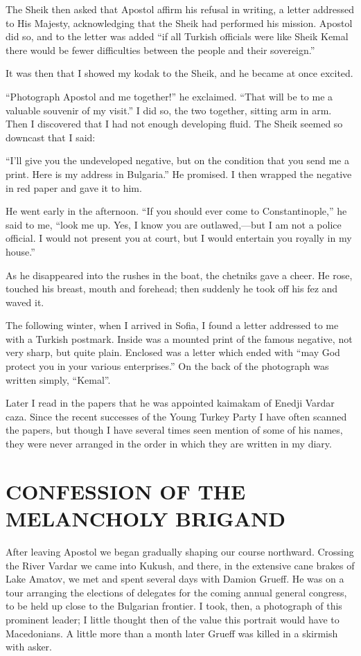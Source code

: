 \documentclass[a5paper,12pt]{book}
\begin{document}
The Sheik then asked that Apostol affirm his refusal in writing, a letter addressed to His Majesty, acknowledging that the Sheik had performed his mission. Apostol did so, and to the letter was added “if all Turkish officials were like Sheik Kemal there would be fewer difficulties between the people and their sovereign.” 

It was then that I showed my kodak to the Sheik, and he became at once excited. 

“Photograph Apostol and me together!” he exclaimed. “That will be to me a valuable souvenir of my visit.” I did so, the two together, sitting arm in arm. Then I discovered that I had not enough developing fluid. The Sheik seemed so downcast that I said: 

“I'll give you the undeveloped negative, but on the condition that you send me a print. Here is my address in Bulgaria.” He promised. I then wrapped the negative in red paper and gave it to him. 

He went early in the afternoon. “If you should ever come to Constantinople,” he said to me, “look me up. Yes, I know you are outlawed,—but I am not a police official. I would not present you at court, but I would entertain you royally in my house.” 

As he disappeared into the rushes in the boat, the chetniks gave a cheer. He rose, touched his breast, mouth and forehead; then suddenly he took off his fez and waved it. 

The following winter, when I arrived in Sofia, I found a letter addressed to me with a Turkish postmark. Inside was a mounted print of the famous negative, not very sharp, but quite plain. Enclosed was a letter which ended with “may God protect you in your various enterprises.” On the back of the photograph was written simply, “Kemal”. 

Later I read in the papers that he was appointed kaimakam of Enedji Vardar caza. Since the recent successes of the Young Turkey Party I have often scanned the papers, but though I have several times seen mention of some of his names, they were never arranged in the order in which they are written in my diary. 


\chapter{CONFESSION OF THE MELANCHOLY BRIGAND}

After leaving Apostol we began gradually shaping our course northward. Crossing the River Vardar we came into Kukush, and there, in the extensive cane brakes of Lake Amatov, we met and spent several days with Damion Grueff. He was on a tour arranging the elections of delegates for the coming annual general congress, to be held up close to the Bulgarian frontier. I took, then, a photograph of this prominent leader; I little thought then of the value this portrait would have to Macedonians. A little more than a month later Grueff was killed in a skirmish with asker.
\end{document}
